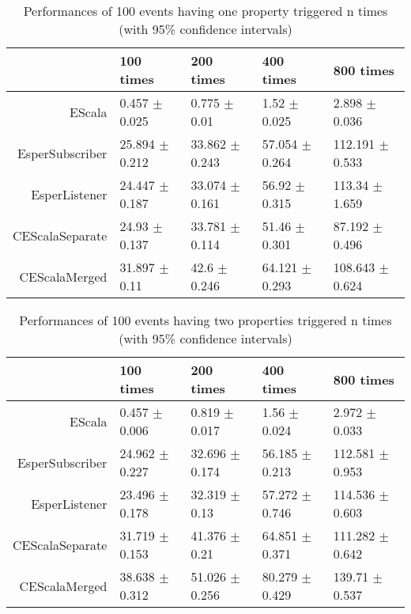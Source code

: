 \begin{table}[tp]
\centering
{\footnotesize
\begin{tabular}{rllll}
  \toprule
 & 100 times & 200 times & 400 times & 800 times \\ 
  \midrule
EScala & 0.457 $\pm$ 0.025 & 0.775 $\pm$ 0.01 & 1.52 $\pm$ 0.025 & 2.898 $\pm$ 0.036 \\ 
  EsperSubscriber & 25.894 $\pm$ 0.212 & 33.862 $\pm$ 0.243 & 57.054 $\pm$ 0.264 & 112.191 $\pm$ 0.533 \\ 
  EsperListener & 24.447 $\pm$ 0.187 & 33.074 $\pm$ 0.161 & 56.92 $\pm$ 0.315 & 113.34 $\pm$ 1.659 \\ 
  CEScalaSeparate & 24.93 $\pm$ 0.137 & 33.781 $\pm$ 0.114 & 51.46 $\pm$ 0.301 & 87.192 $\pm$ 0.496 \\ 
  CEScalaMerged & 31.897 $\pm$ 0.11 & 42.6 $\pm$ 0.246 & 64.121 $\pm$ 0.293 & 108.643 $\pm$ 0.624 \\ 
   \bottomrule
\end{tabular}
}
\caption{Performances of 100 events having one property triggered n times \\ (with 95\% confidence intervals)} 
\label{table:T.SP.Performance}
\end{table}
\begin{table}[tp]
\centering
{\footnotesize
\begin{tabular}{rllll}
  \toprule
 & 100 times & 200 times & 400 times & 800 times \\ 
  \midrule
EScala & 0.457 $\pm$ 0.006 & 0.819 $\pm$ 0.017 & 1.56 $\pm$ 0.024 & 2.972 $\pm$ 0.033 \\ 
  EsperSubscriber & 24.962 $\pm$ 0.227 & 32.696 $\pm$ 0.174 & 56.185 $\pm$ 0.213 & 112.581 $\pm$ 0.953 \\ 
  EsperListener & 23.496 $\pm$ 0.178 & 32.319 $\pm$ 0.13 & 57.272 $\pm$ 0.746 & 114.536 $\pm$ 0.603 \\ 
  CEScalaSeparate & 31.719 $\pm$ 0.153 & 41.376 $\pm$ 0.21 & 64.851 $\pm$ 0.371 & 111.282 $\pm$ 0.642 \\ 
  CEScalaMerged & 38.638 $\pm$ 0.312 & 51.026 $\pm$ 0.256 & 80.279 $\pm$ 0.429 & 139.71 $\pm$ 0.537 \\ 
   \bottomrule
\end{tabular}
}
\caption{Performances of 100 events having two properties triggered n times \\ (with 95\% confidence intervals)} 
\label{table:T.TP.Performance}
\end{table}



